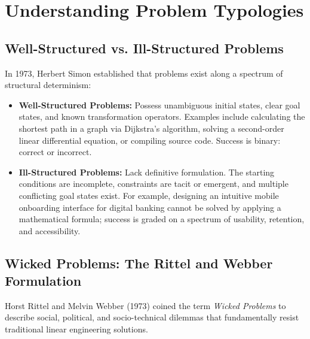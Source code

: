 \section{Understanding Problem Typologies}

\subsection{Well-Structured vs. Ill-Structured Problems}
In 1973, Herbert Simon established that problems exist along a spectrum of structural determinism:
\begin{itemize}
    \item \textbf{Well-Structured Problems:} Possess unambiguous initial states, clear goal states, and known transformation operators. Examples include calculating the shortest path in a graph via Dijkstra's algorithm, solving a second-order linear differential equation, or compiling source code. Success is binary: correct or incorrect.
    \item \textbf{Ill-Structured Problems:} Lack definitive formulation. The starting conditions are incomplete, constraints are tacit or emergent, and multiple conflicting goal states exist. For example, designing an intuitive mobile onboarding interface for digital banking cannot be solved by applying a mathematical formula; success is graded on a spectrum of usability, retention, and accessibility.
\end{itemize}

\subsection{Wicked Problems: The Rittel and Webber Formulation}
Horst Rittel and Melvin Webber (1973) coined the term \textit{Wicked Problems} to describe social, political, and socio-technical dilemmas that fundamentally resist traditional linear engineering solutions. 

